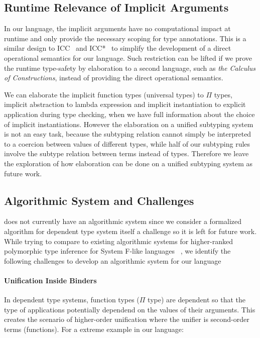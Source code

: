\subsection{Runtime Relevance of Implicit Arguments}

In our language, the implicit arguments have no computational impact at runtime
and only provide the necessary scoping for type annotations. This is
a similar design to ICC~\cite{miquel2001implicit} and
ICC*~\cite{barras2008implicit} to simplify the development of a direct
operational semantics for our language. Such restriction can be lifted if we
prove the runtime type-safety by elaboration to a second language,
such as \emph{the Calculus of Constructions}\cite{coc},
instead of providing the direct operational semantics.

We can elaborate the implicit function types (universal types) to $\Pi$ types,
implicit abstraction to lambda expression and implicit instantiation to explicit
application during type checking, when we have full information about the
choice of implicit instantiations. However the elaboration on a unified subtyping
system is not an easy task, because the subtyping relation cannot simply be interpreted
to a coercion between values of different types, while half of our subtyping
rules involve the subtype relation between terms instead of types.
Therefore we leave the exploration of how elaboration can be done
on a unified subtyping system as future work.

\subsection{Algorithmic System and Challenges}

\name does not currently have an algorithmic system since we
consider a formalized algorithm for dependent type system itself a challenge so it
is left for future work. While trying to compare to existing algorithmic systems
for higher-ranked polymorphic type inference for System F-like languages
~\cite{dunfield2013complete,zhao19mechanical},
we identify the following challenges to develop an algorithmic system for our language

\paragraph{Unification Inside Binders}
In dependent type systems, function types ($\Pi$ type) are dependent so that
the type of applications potentially dependend on the values of their arguments.
This creates the scenario of higher-order unification where the unifier is
second-order terms (functions). For a extreme example in our language:


